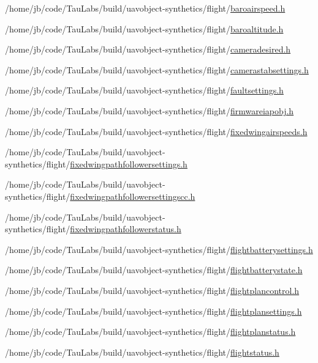 \begin{DoxyCompactItemize}
/home/jb/code/\-Tau\-Labs/build/uavobject-\/synthetics/flight/\hyperlink{baroairspeed_8h}{baroairspeed.\-h}\item 
/home/jb/code/\-Tau\-Labs/build/uavobject-\/synthetics/flight/\hyperlink{baroaltitude_8h}{baroaltitude.\-h}\item 
/home/jb/code/\-Tau\-Labs/build/uavobject-\/synthetics/flight/\hyperlink{cameradesired_8h}{cameradesired.\-h}\item 
/home/jb/code/\-Tau\-Labs/build/uavobject-\/synthetics/flight/\hyperlink{camerastabsettings_8h}{camerastabsettings.\-h}\item 
/home/jb/code/\-Tau\-Labs/build/uavobject-\/synthetics/flight/\hyperlink{faultsettings_8h}{faultsettings.\-h}\item 
/home/jb/code/\-Tau\-Labs/build/uavobject-\/synthetics/flight/\hyperlink{firmwareiapobj_8h}{firmwareiapobj.\-h}\item 
/home/jb/code/\-Tau\-Labs/build/uavobject-\/synthetics/flight/\hyperlink{fixedwingairspeeds_8h}{fixedwingairspeeds.\-h}\item 
/home/jb/code/\-Tau\-Labs/build/uavobject-\/synthetics/flight/\hyperlink{fixedwingpathfollowersettings_8h}{fixedwingpathfollowersettings.\-h}\item 
/home/jb/code/\-Tau\-Labs/build/uavobject-\/synthetics/flight/\hyperlink{fixedwingpathfollowersettingscc_8h}{fixedwingpathfollowersettingscc.\-h}\item 
/home/jb/code/\-Tau\-Labs/build/uavobject-\/synthetics/flight/\hyperlink{fixedwingpathfollowerstatus_8h}{fixedwingpathfollowerstatus.\-h}\item 
/home/jb/code/\-Tau\-Labs/build/uavobject-\/synthetics/flight/\hyperlink{flightbatterysettings_8h}{flightbatterysettings.\-h}\item 
/home/jb/code/\-Tau\-Labs/build/uavobject-\/synthetics/flight/\hyperlink{flightbatterystate_8h}{flightbatterystate.\-h}\item 
/home/jb/code/\-Tau\-Labs/build/uavobject-\/synthetics/flight/\hyperlink{flightplancontrol_8h}{flightplancontrol.\-h}\item 
/home/jb/code/\-Tau\-Labs/build/uavobject-\/synthetics/flight/\hyperlink{flightplansettings_8h}{flightplansettings.\-h}\item 
/home/jb/code/\-Tau\-Labs/build/uavobject-\/synthetics/flight/\hyperlink{flightplanstatus_8h}{flightplanstatus.\-h}\item 
/home/jb/code/\-Tau\-Labs/build/uavobject-\/synthetics/flight/\hyperlink{flightstatus_8h}{flightstatus.\-h}\item 

\end{DoxyCompactItemize}

